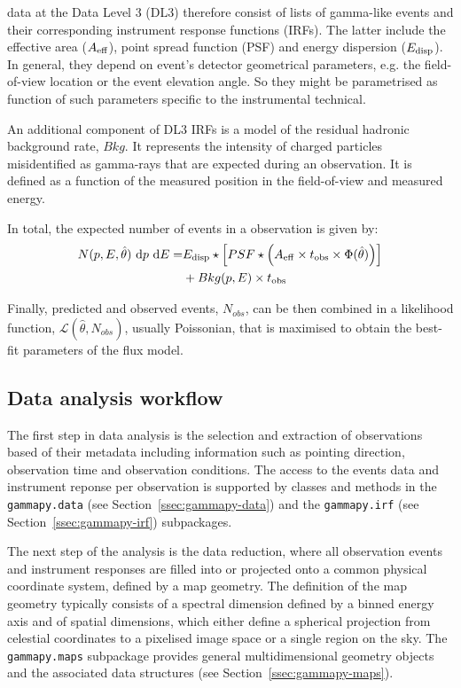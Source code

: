 \documentclass[traditabstract, longauth]{aa}
\newcommand{\code}[1]{\texttt{#1}}
\begin{document}
\gammaray data at the Data Level 3 (DL3) therefore consist of lists of gamma-like events and their
corresponding instrument response functions (IRFs). The latter include the effective area ($A_{\rm eff}$),
point spread function (PSF) and energy dispersion ($E_{\rm disp}$). In general, they depend on event's detector
geometrical parameters, e.g. the field-of-view location or the event elevation angle. So they might be parametrised as
function of such parameters specific to the instrumental technical.

An additional component of DL3 IRFs is a model of the residual hadronic background rate, $Bkg$.
It represents the intensity of charged particles misidentified as gamma-rays that are expected
during an observation. It is defined as a function of the measured position in the field-of-view
and measured energy.

In total, the expected number of events in a \gammaray observation is given by:
\begin{align}
  N(p, E, \hat{\theta})\ {\rm d}p\ {\rm d}E =  &E_{\rm disp} \star \left[ PSF \star \left( A_{\rm eff} \times t_{\rm obs} \times \Phi(\hat{\theta}) \right) \right]  \nonumber\\
                       & + Bkg(p, E) \times t_{\rm obs}
\end{align}

Finally, predicted and observed events, $N_{obs}$, can be then combined in a likelihood function,
$\mathcal{L}(\hat{\theta}, N_{obs})$, usually Poissonian, that is maximised to obtain the best-fit parameters of the flux model.


\subsection{Data analysis workflow}
The first step in \gammaray data analysis is the selection and extraction of observations
based of their metadata including information such as pointing direction, observation
time and observation conditions. The access to the events data and instrument 
reponse per observation is supported by classes and methods
in the \code{gammapy.data} (see Section~\ref{ssec:gammapy-data}) and the \code{gammapy.irf}
(see Section~\ref{ssec:gammapy-irf}) subpackages.

The next step of the analysis is the data reduction, where all observation events and instrument
responses are filled into or projected onto a common physical coordinate system, defined by
a map geometry. The definition of the map geometry typically consists of a spectral dimension
defined by a binned energy axis and of spatial dimensions, which either define 
a spherical projection from celestial coordinates to a pixelised image space
or a single region on the sky. The \code{gammapy.maps} subpackage provides
general multidimensional geometry objects and the associated data structures
(see Section~\ref{ssec:gammapy-maps}).
\end{document}
